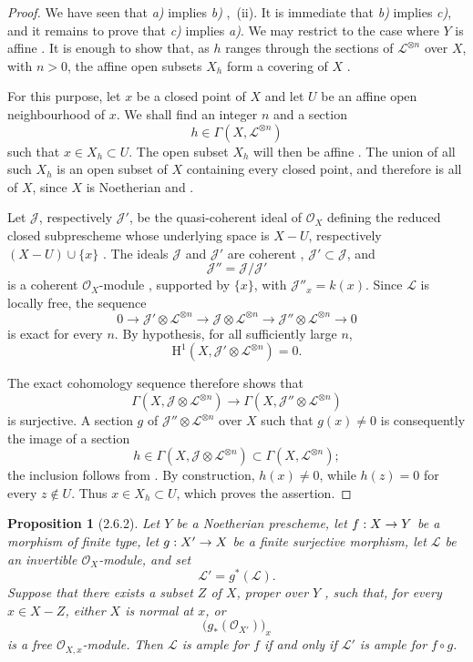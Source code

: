\documentclass[oneside]{amsart}
\theoremstyle{ega-env-style}
\theoremstyle{ega-thm-env-style}
\newtheorem*{proposition}{Proposition}
\theoremstyle{ega-defn-env-style}
\def\mathcal{\mathscr}
\def\sh{\mathcal}                   %
\def\HH{\mathrm{H}}                 %
\def\kres{k}                        %
\renewcommand{\to}{\mathchoice{\longrightarrow}{\rightarrow}{\rightarrow}{\rightarrow}}
\newcommand{\oldpage}[2][]{{\marginnote{\normalfont{\textbf{#1}~|~#2}}}\ignorespaces}
\let\EGAOriginalLabel\label
\renewcommand{\label}[1]{\phantomsection\EGAOriginalLabel{#1}}
\begin{document}
\begin{proof}
We have seen that \emph{a)} implies \emph{b)} ,~(ii).
It is immediate that \emph{b)} implies \emph{c)}, and it remains to prove
that \emph{c)} implies \emph{a)}.
We may restrict to the case where $Y$ is affine .
It is enough to show that, as $h$ ranges through the sections of
$\sh{L}^{\otimes n}$ over $X$, with $n>0$, the affine open subsets $X_h$
form a covering of $X$ .

For this purpose, let $x$ be a closed point of $X$ and let $U$ be an
affine open neighbourhood of $x$.
We shall find an integer $n$ and a section
\[
  h\in\Gamma(X,\sh{L}^{\otimes n})
\]
such that $x\in X_h\subset U$.
The open subset $X_h$ will then be affine .
The union of all such $X_h$ is an open subset of $X$ containing every
closed point, and therefore is all of $X$, since $X$ is Noetherian
 and .

Let $\sh{J}$, respectively $\sh{J}'$, be the quasi-coherent ideal of
$\sh{O}_X$ defining the reduced closed subprescheme whose underlying
space is $X-U$, respectively $(X-U)\cup\{x\}$ .
The ideals $\sh{J}$ and $\sh{J}'$ are coherent ,
$\sh{J}'\subset\sh{J}$, and
\[
  \sh{J}''=\sh{J}/\sh{J}'
\]
is a coherent $\sh{O}_X$-module , supported by
$\{x\}$, with $\sh{J}''_x=\kres(x)$.
Since $\sh{L}$ is locally free, the sequence
\[
  0\longrightarrow
  \sh{J}'\otimes\sh{L}^{\otimes n}
  \longrightarrow
  \sh{J}\otimes\sh{L}^{\otimes n}
  \longrightarrow
  \sh{J}''\otimes\sh{L}^{\otimes n}
  \longrightarrow0
\]
is exact for every $n$.
By hypothesis, for all sufficiently large $n$,
\[
  \HH^1(X,\sh{J}'\otimes\sh{L}^{\otimes n})=0.
\]

\oldpage[III]{112}

The exact cohomology sequence therefore shows that
\[
  \Gamma(X,\sh{J}\otimes\sh{L}^{\otimes n})
  \longrightarrow
  \Gamma(X,\sh{J}''\otimes\sh{L}^{\otimes n})
\]
is surjective.
A section $g$ of $\sh{J}''\otimes\sh{L}^{\otimes n}$ over $X$ such that
$g(x)\neq0$ is consequently the image of a section
\[
  h\in\Gamma(X,\sh{J}\otimes\sh{L}^{\otimes n})
  \subset\Gamma(X,\sh{L}^{\otimes n});
\]
the inclusion follows from .
By construction, $h(x)\neq0$, while $h(z)=0$ for every $z\notin U$.
Thus $x\in X_h\subset U$, which proves the assertion.
\end{proof}

\begin{proposition}[2.6.2]
\label{III.2.6.2}
Let $Y$ be a Noetherian prescheme, let $f:X\to Y$ be a morphism of
finite type, let $g:X'\to X$ be a finite surjective morphism, let
$\sh{L}$ be an invertible $\sh{O}_X$-module, and set
\[
  \sh{L}'=g^*(\sh{L}).
\]
Suppose that there exists a subset $Z$ of $X$, proper over $Y$
, such that, for every $x\in X-Z$, either $X$ is
normal at $x$, or
\[
  \bigl(g_*(\sh{O}_{X'})\bigr)_x
\]
is a free $\sh{O}_{X,x}$-module.
Then $\sh{L}$ is ample for $f$ if and only if $\sh{L}'$ is ample for
$f\circ g$.
\end{proposition}
\end{document}
